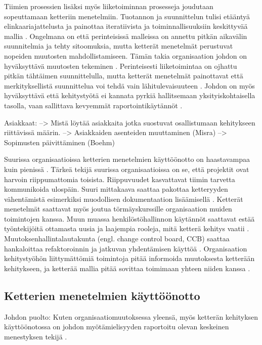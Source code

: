 Tiimien prosessien lisäksi myös liiketoiminnan prosesseja joudutaan sopeuttamaan
ketteriin menetelmiin. Tuotannon ja suunnittelun tulisi etääntyä
elinkaariajattelusta ja painottaa iteratiivista ja toiminnallisuuksiin
keskittyvää mallia . Ongelmana on että perinteisissä
malleissa on annettu pitkän aikavälin suunnitelmia ja tehty sitoomuksia, mutta
ketterät menetelmät perustuvat nopeiden muutosten mahdollistamiseen. Tämän takia
organisaation johdon on hyväksyttävä muutosten tekeminen .
Perinteisesti liiketoimintaa on ojhattu pitkän tähtäimen suunnittelulla, mutta
ketterät menetelmät painottavat että merkityksellistä suunnittelua voi tehdä
vain lähitulevaisuuteen . Johdon on myös hyväksyttävä että
kehitystyötä ei kannata pyrkiä hallitsemaan yksityiskohtaisella tasolla, vaan
sallittava kevyemmät raportointikäytännöt .

Asiakkaat:
--> Mistä löytää asiakkaita jotka suostuvat osallistumaan kehitykseen
riittävissä määrin.
--> Asiakkaiden asenteiden muuttaminen (Misra)
--> Sopimusten päivittäminen (Boehm)

Suurissa organisaatioissa ketterien menetelmien käyttöönotto on haastavampaa
kuin pienissä . Tärkeä tekijä suurissa organisaatioissa
on se, että projektit ovat harvoin riippumattomia toisista. Riippuvuudet
kasvattavat tiimin tarvetta kommunikoida ulospäin. Suuri mittakaava saattaa
pakottaa ketteryyden vähentämistä esimerkiksi muodollisen dokumentaation
lisäämisellä . Ketterät menetelmät saattavat myös joutua
törmäyskurssille organisaation muiden toimintojen kanssa. Muun muassa
henkilöstöhallinnon käytännöt saattavat estää työntekijöitä ottamasta uusia ja
laajempia rooleja, mitä ketterä kehitys vaatii .
Muutoksenhallintalautakunta (engl. change control board, CCB) saattaa
hankaloittaa refaktoroinnin ja jatkuvan yhdentämisen käyttöä
. Organisaation kehitystyöhön liittymättömiä toimintoja
pitää informoida muutoksesta ketterään kehitykseen, ja ketterää mallia pitää
sovittaa toimimaan yhteen niiden kanssa
.

\subsection{Ketterien menetelmien käyttöönotto}

Johdon puolto:
Kuten organisaatiomuutoksessa yleensä, myös ketterän kehityksen käyttöönotossa
on johdon myötämielisyyden raportoitu olevan keskeinen menestyksen tekijä
.

